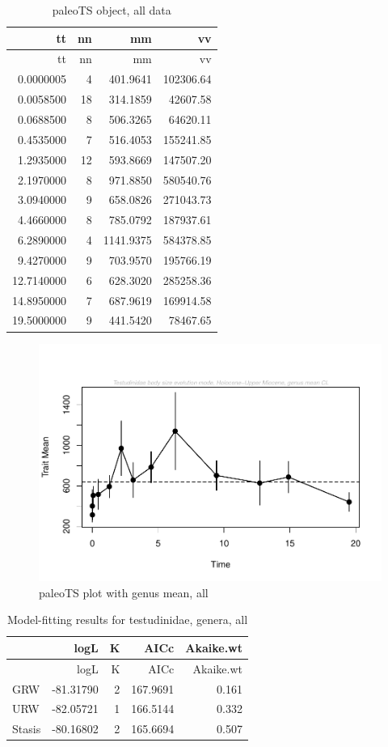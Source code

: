 \documentclass[]{article}
\begin{document}
\begin{longtable}[]{@{}rrrr@{}}
\caption{paleoTS object, all data}\tabularnewline
\toprule
tt & nn & mm & vv\tabularnewline
\midrule
\endfirsthead
\toprule
tt & nn & mm & vv\tabularnewline
\midrule
\endhead
0.0000005 & 4 & 401.9641 & 102306.64\tabularnewline
0.0058500 & 18 & 314.1859 & 42607.58\tabularnewline
0.0688500 & 8 & 506.3265 & 64620.11\tabularnewline
0.4535000 & 7 & 516.4053 & 155241.85\tabularnewline
1.2935000 & 12 & 593.8669 & 147507.20\tabularnewline
2.1970000 & 8 & 971.8850 & 580540.76\tabularnewline
3.0940000 & 9 & 658.0826 & 271043.73\tabularnewline
4.4660000 & 8 & 785.0792 & 187937.61\tabularnewline
6.2890000 & 4 & 1141.9375 & 584378.85\tabularnewline
9.4270000 & 9 & 703.9570 & 195766.19\tabularnewline
12.7140000 & 6 & 628.3020 & 285258.36\tabularnewline
14.8950000 & 7 & 687.9619 & 169914.58\tabularnewline
19.5000000 & 9 & 441.5420 & 78467.65\tabularnewline
\bottomrule
\end{longtable}

\begin{figure}[htbp]
\centering
\includegraphics{MA_JJ_files/figure-latex/paleoTSAll-1.pdf}
\caption{paleoTS plot with genus mean, all}
\end{figure}

\begin{longtable}[]{@{}lrrrr@{}}
\caption{Model-fitting results for testudinidae, genera,
all}\tabularnewline
\toprule
& logL & K & AICc & Akaike.wt\tabularnewline
\midrule
\endfirsthead
\toprule
& logL & K & AICc & Akaike.wt\tabularnewline
\midrule
\endhead
GRW & -81.31790 & 2 & 167.9691 & 0.161\tabularnewline
URW & -82.05721 & 1 & 166.5144 & 0.332\tabularnewline
Stasis & -80.16802 & 2 & 165.6694 & 0.507\tabularnewline
\bottomrule
\end{longtable}
\end{document}
